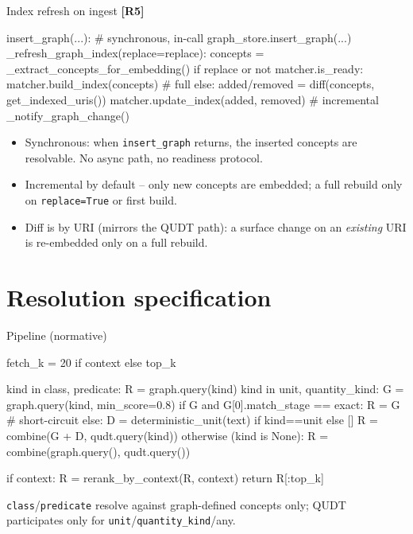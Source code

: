 \documentclass[aspectratio=169]{beamer}
\newcommand{\code}[1]{\texttt{\small #1}}
\newcommand{\req}[1]{\textbf{[#1]}}
\begin{document}
\begin{frame}[fragile]{Index refresh on ingest \req{R5}}
  \begin{semiverbatim}\scriptsize
insert_graph(...):                       # synchronous, in-call
  graph_store.insert_graph(...)
  _refresh_graph_index(replace=replace):
    concepts = _extract_concepts_for_embedding()
    if replace or not matcher.is_ready:
        matcher.build_index(concepts)               # full
    else:
        added/removed = diff(concepts, get_indexed_uris())
        matcher.update_index(added, removed)         # incremental
  _notify_graph_change()
  \end{semiverbatim}
  \begin{itemize}
    \item Synchronous: when \code{insert\_graph} returns, the inserted
          concepts are resolvable. No async path, no readiness protocol.
    \item Incremental by default -- only new concepts are embedded; a full
          rebuild only on \code{replace=True} or first build.
    \item Diff is by URI (mirrors the QUDT path): a surface change on an
          \emph{existing} URI is re-embedded only on a full rebuild.
  \end{itemize}
\end{frame}

\section{Resolution specification}

\begin{frame}[fragile]{Pipeline (normative)}
  \begin{semiverbatim}\scriptsize
fetch_k = 20 if context else top_k

kind in {class, predicate}:
    R = graph.query(kind)
kind in {unit, quantity_kind}:
    G = graph.query(kind, min_score=0.8)
    if G and G[0].match_stage == exact:  R = G          # short-circuit
    else:
        D = deterministic_unit(text) if kind==unit else []
        R = combine(G + D, qudt.query(kind))
otherwise (kind is None):
    R = combine(graph.query(), qudt.query())

if context: R = rerank_by_context(R, context)
return R[:top_k]
  \end{semiverbatim}
  \code{class}/\code{predicate} resolve against graph-defined concepts
  only; QUDT participates only for \code{unit}/\code{quantity\_kind}/any.
\end{frame}
\end{document}
